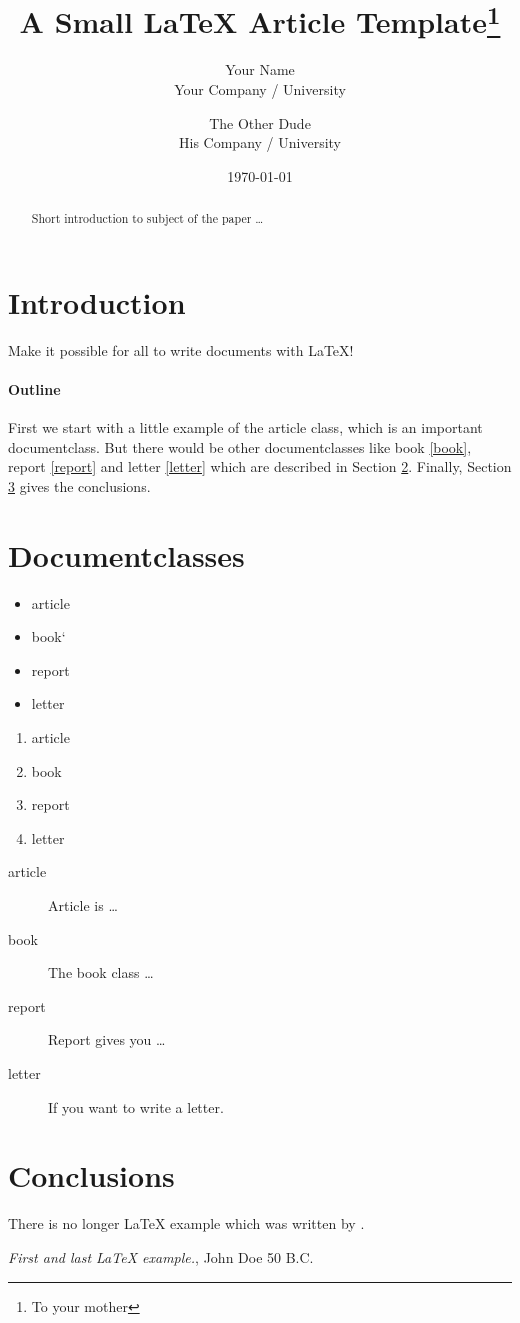 \documentclass{article}
\title{A Small \LaTeX{} Article Template\thanks{To your mother}}
\author{Your Name  \\
	Your Company / University  \\
	\and 
	The Other Dude \\
	His Company / University \\
	}
\date{\today}
\begin{document}
\maketitle


\begin{abstract}
Short introduction to subject of the paper \ldots 
\end{abstract}

\section{Introduction}
Make it possible for all to write documents with \LaTeX{}!

\paragraph{Outline}
First we start with a little example of the article class, which is an 
important documentclass. But there would be other documentclasses like 
book \ref{book}, report \ref{report} and letter \ref{letter} which are 
described in Section \ref{documentclasses}. Finally, Section 
\ref{conclusions} gives the conclusions.



\section{Documentclasses} \label{documentclasses}

\begin{itemize}
\item article
\item book`
\item report 
\item letter 
\end{itemize}


\begin{enumerate}
\item article
\item book 
\item report 
\item letter 
\end{enumerate}

\begin{description}
\item[article\label{article}]{Article is \ldots}
\item[book\label{book}]{The book class \ldots}
\item[report\label{report}]{Report gives you \ldots}
\item[letter\label{letter}]{If you want to write a letter.}
\end{description}


\section{Conclusions}\label{conclusions}
There is no longer \LaTeX{} example which was written by \cite{doe}.


\begin{thebibliography}{9}
 \emph{First and last \LaTeX{} example.},
John Doe 50 B.C. 
\end{thebibliography}
\end{document}

